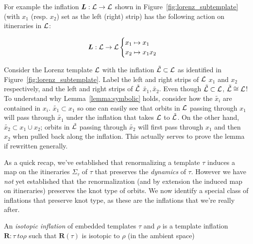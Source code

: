 \documentclass[paper.tex]{subfiles}
\begin{document}
For example the inflation $\bm{L} : \mathcal{L} \to \mathcal{L}$ shown in Figure~\ref{fig:lorenz_subtemplate} (with $x_1$ (resp. $x_2$) set as the left (right) strip) has the following action on itineraries in $\mathcal{L}$:

\begin{equation}
\bm{L} : \mathcal{L} \to \mathcal{L}  \begin{cases} x_1 \mapsto x_1 \\ x_2 \mapsto x_1 x_2 \end{cases}
\end{equation}

Consider the Lorenz template $\mathcal{L}$ with the inflation $\tilde{\mathcal{L}} \subset \mathcal{L}$ as identified in Figure~\ref{fig:lorenz_subtemplate}.
Label the left and right strips of $\mathcal{L}$ $x_1$ and $x_2$ respectively, and the left and right strips of $\tilde{\mathcal{L}}$ $\tilde{x_1}, \tilde{x_2}$.
Even though $\tilde{\mathcal{L}} \subset \mathcal{L}$, $\tilde{\mathcal{L}} \cong \mathcal{L}$! To understand why Lemma~\ref{lemma:symbolic} holds, consider how the $\tilde{x_i}$ are contained in $x_i$. $\tilde{x_1} \subset x_1$ so one can easily see that
orbits in $\mathcal{L}$ passing through $x_1$ will pass through $\tilde{x_1}$ under the inflation that takes $\mathcal{L}$ to $\tilde{\mathcal{L}}$. On the other hand, $\tilde{x_2} \subset x_1 \cup x_2$; orbits in $\tilde{\mathcal{L}}$ passing through
$\tilde{x_2}$ will first pass through $x_1$ and then $x_2$ when pulled back along the inflation. This actually serves to prove the lemma if rewritten generally.

As a quick recap, we've established that renormalizing a template $\tau$ induces a map on the itineraries $\Sigma_\tau$ of $\tau$ that preserves the \emph{dynamics} of $\tau$. However we have \emph{not} yet established
that the renormalization (and by extension the induced map on itineraries)  preserves the knot type of orbits. We now identify a special class of inflations that preserve knot type, as these are the inflations that we're really after.

\begin{definition}
  An \emph{isotopic inflation} of embedded templates $\tau$ and $\rho$ is a template inflation $\bm{R}: \tau \ to \rho$ such that $\bm{R}(\tau)$ is isotopic to $\rho$ (in the ambient space)
\end{definition}
\end{document}
